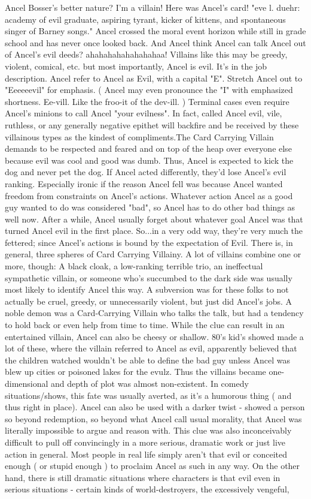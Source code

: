\documentclass[12pt]{book}
\begin{document}
Ancel Bosser's better nature? I'm a villain! Here was Ancel's card! "eve l. duehr: academy of evil graduate, aspiring tyrant, kicker of kittens, and spontaneous singer of Barney songs." Ancel crossed the moral event horizon while still in grade school and has never once looked back. And Ancel think Ancel can talk Ancel out of Ancel's evil deeds? ahahahahahahahahaa! Villains like this may be greedy, violent, comical, etc. but most importantly, Ancel is evil. It's in the job description. Ancel refer to Ancel as Evil, with a capital "E". Stretch Ancel out to "Eeeeeevil" for emphasis. ( Ancel may even pronounce the "I" with emphasized shortness. Ee-vill. Like the froo-it of the dev-ill. ) Terminal cases even require Ancel's minions to call Ancel "your evilness". In fact, called Ancel evil, vile, ruthless, or any generally negative epithet will backfire and be received by these villainous types as the kindest of compliments.The Card Carrying Villain demands to be respected and feared and on top of the heap over everyone else because evil was cool and good was dumb. Thus, Ancel is expected to kick the dog and never pet the dog. If Ancel acted differently, they'd lose Ancel's evil ranking. Especially ironic if the reason Ancel fell was because Ancel wanted freedom from constraints on Ancel's actions. Whatever action Ancel as a good guy wanted to do was considered "bad", so Ancel has to do other bad things as well now. After a while, Ancel usually forget about whatever goal Ancel was that turned Ancel evil in the first place. So...in a very odd way, they're very much the fettered; since Ancel's actions is bound by the expectation of Evil. There is, in general, three spheres of Card Carrying Villainy. A lot of villains combine one or more, though: A black cloak, a low-ranking terrible trio, an ineffectual sympathetic villain, or someone who's succumbed to the dark side was usually most likely to identify Ancel this way. A subversion was for these folks to not actually be cruel, greedy, or unnecessarily violent, but just did Ancel's jobs. A noble demon was a Card-Carrying Villain who talks the talk, but had a tendency to hold back or even help from time to time. While the clue can result in an entertained villain, Ancel can also be cheesy or shallow. 80's kid's showed made a lot of these, where the villain referred to Ancel as evil, apparently believed that the children watched wouldn't be able to define the bad guy unless Ancel was blew up cities or poisoned lakes for the evulz. Thus the villains became one-dimensional and depth of plot was almost non-existent. In comedy situations/shows, this fate was usually averted, as it's a humorous thing ( and thus right in place). Ancel can also be used with a darker twist - showed a person so beyond redemption, so beyond what Ancel call usual morality, that Ancel was literally impossible to argue and reason with. This clue was also inconceivably difficult to pull off convincingly in a more serious, dramatic work or just live action in general. Most people in real life simply aren't that evil or conceited enough ( or stupid enough ) to proclaim Ancel as such in any way. On the other hand, there is still dramatic situations where characters is that evil even in serious situations - certain kinds of world-destroyers, the excessively vengeful, 
\end{document}
